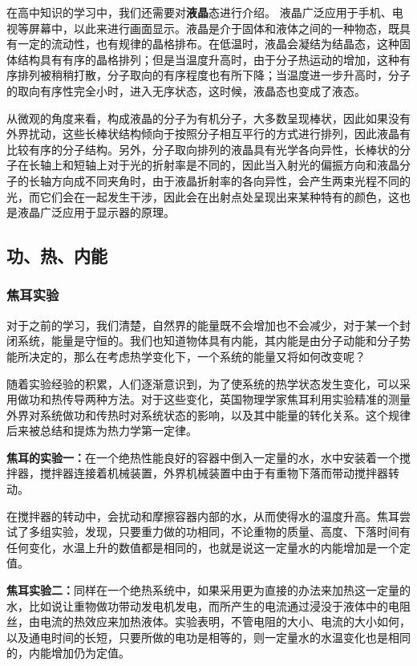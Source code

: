 在高中知识的学习中，我们还需要对\textbf{液晶}态进行介绍。 液晶广泛应用于手机、电视等屏幕中，以此来进行画面显示。液晶是介于固体和液体之间的一种物态，既具有一定的流动性，也有规律的晶格排布。在低温时，液晶会凝结为结晶态，这种固体结构具有有序的晶格排列；但是当温度升高时，由于分子热运动的增加，这种有序排列被稍稍打散，分子取向的有序程度也有所下降；当温度进一步升高时，分子的取向有序性完全小时，进入无序状态，这时候，液晶态也变成了液态。

从微观的角度来看，构成液晶的分子为有机分子，大多数呈现棒状，因此如果没有外界扰动，这些长棒状结构倾向于按照分子相互平行的方式进行排列，因此液晶有比较有序的分子结构。另外，分子取向排列的液晶具有光学各向异性，长棒状的分子在长轴上和短轴上对于光的折射率是不同的，因此当入射光的偏振方向和液晶分子的长轴方向成不同夹角时，由于液晶折射率的各向异性，会产生两束光程不同的光，而它们会在一起发生干涉，因此会在出射点处呈现出来某种特有的颜色，这也是液晶广泛应用于显示器的原理。
\subsection{功、热、内能}
\subsubsection{焦耳实验}
对于之前的学习，我们清楚，自然界的能量既不会增加也不会减少，对于某一个封闭系统，能量是守恒的。我们也知道物体具有内能，其内能是由分子动能和分子势能所决定的，那么在考虑热学变化下，一个系统的能量又将如何改变呢？

随着实验经验的积累，人们逐渐意识到，为了使系统的热学状态发生变化，可以采用做功和热传导两种方法。对于这些变化，英国物理学家焦耳利用实验精准的测量外界对系统做功和传热时对系统状态的影响，以及其中能量的转化关系。这个规律后来被总结和提炼为热力学第一定律。

\textbf{焦耳的实验一：}在一个绝热性能良好的容器中倒入一定量的水，水中安装着一个搅拌器，搅拌器连接着机械装置，外界机械装置中由于有重物下落而带动搅拌器转动。

在搅拌器的转动中，会扰动和摩擦容器内部的水，从而使得水的温度升高。焦耳尝试了多组实验，发现，只要重力做的功相同，不论重物的质量、高度、下落时间有任何变化，水温上升的数值都是相同的，也就是说这一定量水的内能增加是一个定值。%

\textbf{焦耳实验二：}同样在一个绝热系统中，如果采用更为直接的办法来加热这一定量的水，比如说让重物做功带动发电机发电，而所产生的电流通过浸没于液体中的电阻丝，由电流的热效应来加热液体。实验表明，不管电阻的大小、电流的大小如何，以及通电时间的长短，只要所做的电功是相等的，则一定量水的水温变化也是相同的，内能增加仍为定值。

